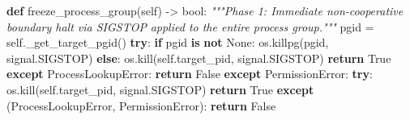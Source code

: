 \documentclass[
  10pt,letterpaper]{article}
\newenvironment{Shaded}{}{}
\newcommand{\BuiltInTok}[1]{\textcolor[rgb]{0.00,0.50,0.00}{#1}}
\newcommand{\CommentTok}[1]{\textcolor[rgb]{0.38,0.63,0.69}{\textit{#1}}}
\newcommand{\ControlFlowTok}[1]{\textcolor[rgb]{0.00,0.44,0.13}{\textbf{#1}}}
\newcommand{\KeywordTok}[1]{\textcolor[rgb]{0.00,0.44,0.13}{\textbf{#1}}}
\newcommand{\NormalTok}[1]{#1}
\newcommand{\OperatorTok}[1]{\textcolor[rgb]{0.40,0.40,0.40}{#1}}
\newcommand{\PreprocessorTok}[1]{\textcolor[rgb]{0.74,0.48,0.00}{#1}}
\newcommand{\VariableTok}[1]{\textcolor[rgb]{0.10,0.09,0.49}{#1}}
\begin{document}
\begin{Shaded}
\begin{Highlighting}[]
    \KeywordTok{def}\NormalTok{ freeze\_process\_group(}\VariableTok{self}\NormalTok{) }\OperatorTok{{-}\textgreater{}} \BuiltInTok{bool}\NormalTok{:}
        \CommentTok{"""Phase 1: Immediate non{-}cooperative boundary halt via SIGSTOP}
\CommentTok{        applied to the entire process group."""}
\NormalTok{        pgid }\OperatorTok{=} \VariableTok{self}\NormalTok{.\_get\_target\_pgid()}
        \ControlFlowTok{try}\NormalTok{:}
            \ControlFlowTok{if}\NormalTok{ pgid }\KeywordTok{is} \KeywordTok{not} \VariableTok{None}\NormalTok{:}
\NormalTok{                os.killpg(pgid, signal.SIGSTOP)}
            \ControlFlowTok{else}\NormalTok{:}
\NormalTok{                os.kill(}\VariableTok{self}\NormalTok{.target\_pid, signal.SIGSTOP)}
            \ControlFlowTok{return} \VariableTok{True}
        \ControlFlowTok{except} \PreprocessorTok{ProcessLookupError}\NormalTok{:}
            \ControlFlowTok{return} \VariableTok{False}
        \ControlFlowTok{except} \PreprocessorTok{PermissionError}\NormalTok{:}
            \ControlFlowTok{try}\NormalTok{:}
\NormalTok{                os.kill(}\VariableTok{self}\NormalTok{.target\_pid, signal.SIGSTOP)}
                \ControlFlowTok{return} \VariableTok{True}
            \ControlFlowTok{except}\NormalTok{ (}\PreprocessorTok{ProcessLookupError}\NormalTok{, }\PreprocessorTok{PermissionError}\NormalTok{):}
                \ControlFlowTok{return} \VariableTok{False}


\end{Highlighting}
\end{Shaded}
\end{document}
